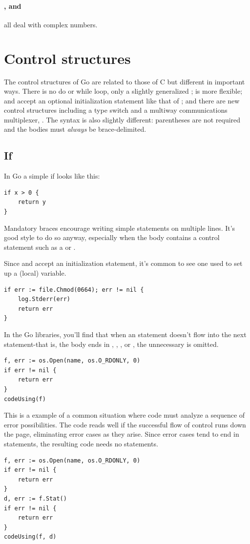 \paragraph{,  and } all deal with
complex numbers.

\section{Control structures}
The control structures of Go are related to those of C but different in
important ways. There is no do or while loop, only a slightly
generalized ;  is more flexible;  and
 accept an
optional initialization statement like that of ; and there are new
control structures including a type switch and a multiway communications
multiplexer, . The syntax is also slightly different: parentheses
are not required and the bodies must \emph{always} be brace-delimited.

\subsection{If}
In Go a simple if looks like this:
\begin{lstlisting}
if x > 0 {
    return y
}
\end{lstlisting}
Mandatory braces encourage writing simple  statements on multiple
lines. It's good style to do so anyway, especially when the body
contains a control statement such as a  or .

Since  and  accept an initialization statement, it's common to
see one used to set up a (local) variable.

\begin{lstlisting}
if err := file.Chmod(0664); err != nil {
    log.Stderr(err)
    return err
}
\end{lstlisting}
In the Go libraries, you'll find that when an  statement doesn't flow
into the next statement-that is, the body ends in ,
, ,
or , the unnecessary  is omitted.

\begin{lstlisting}
f, err := os.Open(name, os.O_RDONLY, 0)
if err != nil {
    return err
}
codeUsing(f)
\end{lstlisting}
This is a example of a common situation where code must analyze a
sequence of error possibilities. The code reads well if the successful
flow of control runs down the page, eliminating error cases as they
arise. Since error cases tend to end in  statements, the resulting
code needs no  statements.
\begin{lstlisting}
f, err := os.Open(name, os.O_RDONLY, 0)
if err != nil {
    return err
}
d, err := f.Stat()
if err != nil {
    return err
}
codeUsing(f, d)
\end{lstlisting}

